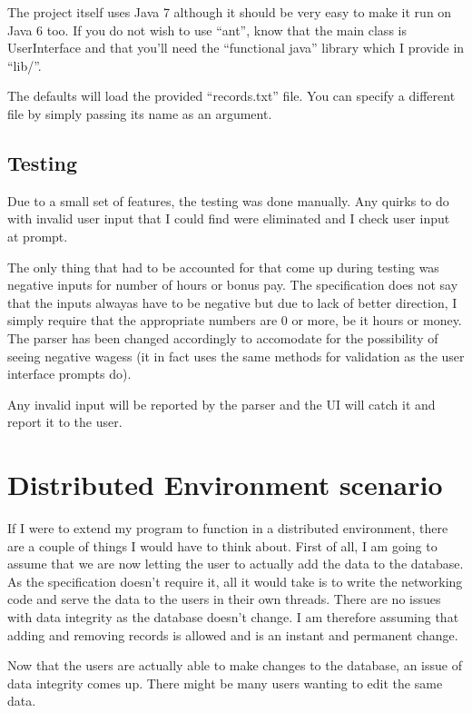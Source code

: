 \documentclass{report}
\begin{document}
The project itself uses Java 7 although it should be very easy to make
it run on Java 6 too. If you do not wish to use ``ant'', know that the
main class is UserInterface and that you'll need the ``functional
java'' library which I provide in ``lib/''.

The defaults will load the provided ``records.txt'' file. You can
specify a different file by simply passing its name as an argument.

\subsection*{Testing}
Due to a small set of features, the testing was done manually. Any
quirks to do with invalid user input that I could find were eliminated
and I check user input at prompt.

The only thing that had to be accounted for that come up during
testing was negative inputs for number of hours or bonus pay. The
specification does not say that the inputs alwayas have to be negative
but due to lack of better direction, I simply require that the
appropriate numbers are 0 or more, be it hours or money. The parser
has been changed accordingly to accomodate for the possibility of
seeing negative wagess (it in fact uses the same methods for
validation as the user interface prompts do).

Any invalid input will be reported by the parser and the UI will catch
it and report it to the user.


\section*{Distributed Environment scenario}
If I were to extend my program to function in a distributed
environment, there are a couple of things I would have to think about.
First of all, I am going to assume that we are now letting the user to
actually add the data to the database. As the specification doesn't
require it, all it would take is to write the networking code and
serve the data to the users in their own threads. There are no issues
with data integrity as the database doesn't change. I am therefore
assuming that adding and removing records is allowed and is an instant
and permanent change.

Now that the users are actually able to make changes to the database,
an issue of data integrity comes up. There might be many users wanting
to edit the same data.
\end{document}
